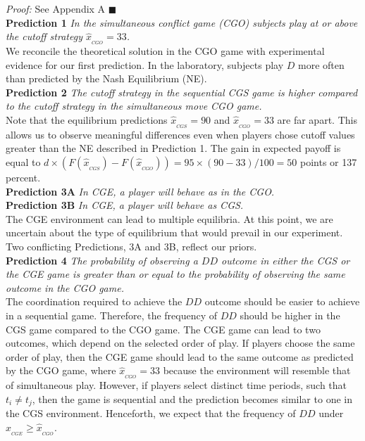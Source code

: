 \documentclass[12pt, letterpaper]{article}
\theoremstyle{plain}
\begin{document}
\noindent \textit{Proof:} See Appendix A $\blacksquare$
\\

\noindent \textbf{Prediction 1}
\textit{In the simultaneous conflict game (CGO) subjects play at or above the cutoff strategy $\hat{x}_{_{CGO}}=33$.}\\

We reconcile the theoretical solution in the CGO game with experimental evidence for our first prediction. In the laboratory, subjects play $D$ more often than predicted by the Nash Equilibrium (NE). \\

\noindent \textbf{Prediction 2}
\textit{The cutoff strategy in the sequential CGS game is higher compared to the cutoff strategy in the simultaneous move CGO game.}\\

Note that the equilibrium predictions $\hat{x}_{_{CGS}}=90$ and $\hat{x}_{_{CGO}}=33$ are far apart. This allows us to observe meaningful differences even when players chose cutoff values greater than the NE described in Prediction 1. The gain in expected payoff is equal to $d\times \left( F(\hat{x}_{_{CGS}})-F(\hat{x}_{_{CGO}}) \right)=95\times( 90-33)/100=50$ points or 137 percent. \\

\noindent \textbf{Prediction 3A} \textit{In CGE, a player will behave as in the CGO. }\\
\noindent \textbf{Prediction 3B} \textit{In CGE, a player will behave as CGS.}\\

The CGE environment can lead to multiple equilibria. At this point, we are uncertain about the type of equilibrium that would prevail in our experiment. Two conflicting Predictions, 3A and 3B, reflect our priors. \\

\noindent \textbf{Prediction 4}
\textit{The probability of observing a $DD$ outcome in either the CGS or the CGE game is greater than or equal to the probability of observing the same outcome in the CGO game.}\\

The coordination required to achieve the $DD$ outcome should be easier to achieve in a sequential game. Therefore, the frequency of $DD$ should be higher in the CGS game compared to the CGO game. The CGE game can lead to two outcomes, which depend on the selected order of play. If players choose the same order of play, then the CGE game should lead to the same outcome as predicted by the CGO game, where $\hat{x}_{_{CGO}}=33$ because the environment will resemble that of simultaneous play. However, if players select distinct time periods, such that $t_i\neq t_j$, then the game is sequential and the prediction becomes similar to one in the CGS environment.  Henceforth, we expect that the frequency of $DD$ under $\hat{x}_{_{CGE}}\geq \hat{x}_{_{CGO}}$.  \\
\end{document}
